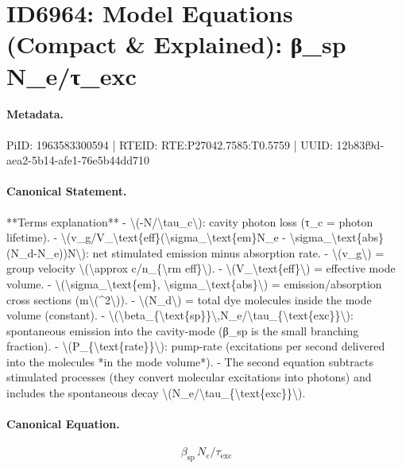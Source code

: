\section*{ID6964: Model Equations (Compact \& Explained): β\_sp N\_e/τ\_exc}
\paragraph{Metadata.}
PiID: 1963583300594 | RTEID: RTE:P27042.7585:T0.5759 | UUID: 12b83f9d-aea2-5b14-afe1-76e5b44dd710

\paragraph{Canonical Statement.}
**Terms explanation** - \textbackslash{}(-N/\textbackslash{}tau\_c\textbackslash{}): cavity photon loss (τ\_c = photon lifetime). - \textbackslash{}(v\_g/V\_\textbackslash{}text\{eff\}(\textbackslash{}sigma\_\textbackslash{}text\{em\}N\_e - \textbackslash{}sigma\_\textbackslash{}text\{abs\}(N\_d-N\_e))N\textbackslash{}): net stimulated emission minus absorption rate. - \textbackslash{}(v\_g\textbackslash{}) = group velocity \textbackslash{}(\textbackslash{}approx c/n\_\{\textbackslash{}rm eff\}\textbackslash{}). - \textbackslash{}(V\_\textbackslash{}text\{eff\}\textbackslash{}) = effective mode volume. - \textbackslash{}(\textbackslash{}sigma\_\textbackslash{}text\{em\}, \textbackslash{}sigma\_\textbackslash{}text\{abs\}\textbackslash{}) = emission/absorption cross sections (m\textbackslash{}(\textasciicircum{}2\textbackslash{})). - \textbackslash{}(N\_d\textbackslash{}) = total dye molecules inside the mode volume (constant). - \textbackslash{}(\textbackslash{}beta\_\{\textbackslash{}text\{sp\}\}\textbackslash{},N\_e/\textbackslash{}tau\_\{\textbackslash{}text\{exc\}\}\textbackslash{}): spontaneous emission into the cavity-mode (β\_sp is the small branching fraction). - \textbackslash{}(P\_\{\textbackslash{}text\{rate\}\}\textbackslash{}): pump-rate (excitations per second delivered into the molecules *in the mode volume*). - The second equation subtracts stimulated processes (they convert molecular excitations into photons) and includes the spontaneous decay \textbackslash{}(N\_e/\textbackslash{}tau\_\{\textbackslash{}text\{exc\}\}\textbackslash{}).

\paragraph{Canonical Equation.}
\[
\beta_{\text{sp}}\,N_e/\tau_{\text{exc}}
\]

